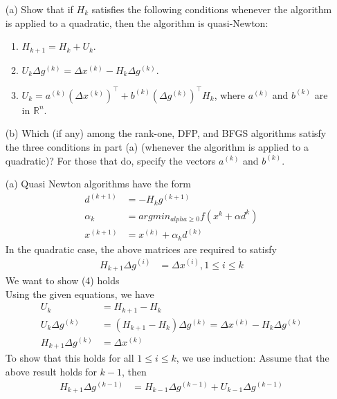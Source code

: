 \documentclass{article}
\begin{document}
\begin{enumerate}
\begin{bb}
\begin{enumerate}
    \item[(a)] Show that if $H_k$ satisfies the following conditions whenever the algorithm is applied to a quadratic, then the algorithm is quasi-Newton:
    \begin{enumerate}
        \item $H_{k+1} = H_k + U_k$.
        \item $U_k \Delta g^{(k)} = \Delta x^{(k)} - H_k \Delta g^{(k)}$.
        \item $U_k = a^{(k)} (\Delta x^{(k)})^\top + b^{(k)} (\Delta g^{(k)})^\top H_k$, where $a^{(k)}$ and $b^{(k)}$ are in $\mathbb{R}^n$.
    \end{enumerate}

    \item[(b)] Which (if any) among the rank-one, DFP, and BFGS algorithms satisfy the three conditions in part (a) (whenever the algorithm is applied to a quadratic)? For those that do, specify the vectors $a^{(k)}$ and $b^{(k)}$.
\end{enumerate}
\end{bb}
\begin{enumerate}
  \item[(a)]
  Quasi Newton algorithms have the form
  \begin{align}
    d^{(k+1)} &= -H_k g^{(k+1)} \\
    \alpha_{k} &= argmin_{alpha\geq0}f(x^{k}+\alpha d^{k})\\
    x^{(k+1)} &= x^{(k)} + \alpha_k d^{(k)}
  \end{align}
  In the quadratic case, the above matrices are required to satisfy \begin{align}
    H_{k+1}\Delta g^{(i)}&=\Delta x^{(i)}, 1\leq i \leq k
  \end{align}
We want to show (4) holds \\
Using the given equations, we have 
\begin{align}
  U_{k} &= H_{k+1} - H_{k}\\
  U_{k}\Delta g^{(k)} &= (H_{k+1} - H_{k}) \Delta g^{(k)} = \Delta x^{(k)} - H_{k}\Delta g^{(k)} \\
  H_{k+1}\Delta g^{(k)} &= \Delta x^{(k)} 
\end{align}
To show that this holds for all $1 \leq i \leq k$, we use induction:
Assume that the above result holds for $k-1$, then
\begin{align}
H_{k+1}\Delta g^{(k-1)} &=  H_{k-1}\Delta g^{(k-1)}+ U_{k-1}\Delta g^{(k-1)} \\

\end{align}
\end{enumerate}
\end{enumerate}
\end{document}
